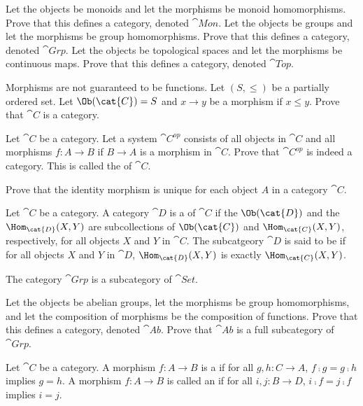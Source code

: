 \documentclass[10pt]{article}
\begin{document}
\begin{problem}
    Let the objects be monoids and let the morphisms be monoid homomorphisms. Prove that this defines a category, denoted $\cat{Mon}$. Let the objects be groups and let the morphisms be group homomorphisms. Prove that this defines a category, denoted $\cat{Grp}$. Let the objects be topological spaces and let the morphisms be continuous maps. Prove that this defines a category, denoted $\cat{Top}$.
\end{problem}
\begin{problem}
    Morphisms are not guaranteed to be functions. Let $(S,\le)$ be a partially ordered set. Let $\Ob(\cat{C})=S$ and $x\to y$ be a morphism if $x\le y$. Prove that $\cat{C}$ is a category.
\end{problem}
\begin{problem}
    Let $\cat{C}$ be a category. Let a system $\cat{{C}^{op}}$ consists of all objects in $\cat{C}$ and all morphisms $f:A\to B$ if $B\to A$ is a morphism in $\cat{C}$. Prove that $\cat{{C}^{op}}$ is indeed a category. This is called the  of $\cat{C}$.
\end{problem}
\begin{problem}
    Prove that the identity morphism is unique for each object $A$ in a category $\cat{C}$.
\end{problem}
\begin{definition}
    Let $\cat{C}$ be a category. A category $\cat{D}$ is a  of $\cat{C}$ if the $\Ob(\cat{D})$ and the ${\Hom}_{\cat{D}}(X,Y)$ are subcollections of $\Ob(\cat{C})$ and ${\Hom}_{\cat{C}}(X,Y)$, respectively, for all objects $X$ and $Y$ in $\cat{C}$. The subcatgeory $\cat{D}$ is said to be  if for all objects $X$ and $Y$ in $\cat{D}$, ${\Hom}_{\cat{D}}(X,Y)$ is exactly ${\Hom}_{\cat{C}}(X,Y)$.
\end{definition}
\begin{example}
    The category $\cat{Grp}$ is a subcategory of $\cat{Set}$.
\end{example}
\begin{problem}
    Let the objects be abelian groups, let the morphisms be group homomorphisms, and let the composition of morphisms be the composition of functions. Prove that this defines a category, denoted $\cat{Ab}$. Prove that $\cat{Ab}$ is a full subcategory of $\cat{Grp}$.
\end{problem}
\begin{definition}
    Let $\cat{C}$ be a category. A morphism $f:A\to B$ is a  if for all $g,h:C\to A$, $f\comp g=g\comp h$ implies $g=h$. A morphism $f:A\to B$ is called an  if for all $i,j:B\to D$, $i\comp f=j\comp f$ implies $i=j$.
\end{definition}
\end{document}
